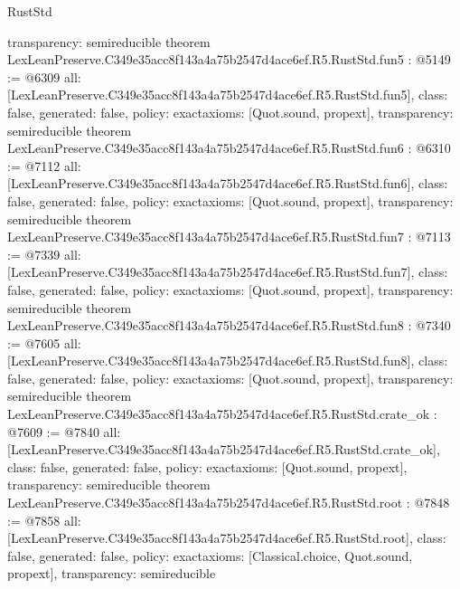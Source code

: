 \begin{lexlean}{RustStd}
\begin{coremodule}
{  transparency: semireducible
}
theorem LexLeanPreserve.C349e35acc8f143a4a75b2547d4ace6ef.R5.RustStd.fun5 : @5149 := @6309 {
  all: [LexLeanPreserve.C349e35acc8f143a4a75b2547d4ace6ef.R5.RustStd.fun5],
  class: false,
  generated: false,
  policy: exact{axioms: [Quot.sound, propext]},
  transparency: semireducible
}
theorem LexLeanPreserve.C349e35acc8f143a4a75b2547d4ace6ef.R5.RustStd.fun6 : @6310 := @7112 {
  all: [LexLeanPreserve.C349e35acc8f143a4a75b2547d4ace6ef.R5.RustStd.fun6],
  class: false,
  generated: false,
  policy: exact{axioms: [Quot.sound, propext]},
  transparency: semireducible
}
theorem LexLeanPreserve.C349e35acc8f143a4a75b2547d4ace6ef.R5.RustStd.fun7 : @7113 := @7339 {
  all: [LexLeanPreserve.C349e35acc8f143a4a75b2547d4ace6ef.R5.RustStd.fun7],
  class: false,
  generated: false,
  policy: exact{axioms: [Quot.sound, propext]},
  transparency: semireducible
}
theorem LexLeanPreserve.C349e35acc8f143a4a75b2547d4ace6ef.R5.RustStd.fun8 : @7340 := @7605 {
  all: [LexLeanPreserve.C349e35acc8f143a4a75b2547d4ace6ef.R5.RustStd.fun8],
  class: false,
  generated: false,
  policy: exact{axioms: [Quot.sound, propext]},
  transparency: semireducible
}
theorem LexLeanPreserve.C349e35acc8f143a4a75b2547d4ace6ef.R5.RustStd.crate_ok : @7609 := @7840 {
  all: [LexLeanPreserve.C349e35acc8f143a4a75b2547d4ace6ef.R5.RustStd.crate_ok],
  class: false,
  generated: false,
  policy: exact{axioms: [Quot.sound, propext]},
  transparency: semireducible
}
theorem LexLeanPreserve.C349e35acc8f143a4a75b2547d4ace6ef.R5.RustStd.root : @7848 := @7858 {
  all: [LexLeanPreserve.C349e35acc8f143a4a75b2547d4ace6ef.R5.RustStd.root],
  class: false,
  generated: false,
  policy: exact{axioms: [Classical.choice, Quot.sound, propext]},
  transparency: semireducible
}


\end{coremodule}
\end{lexlean}
